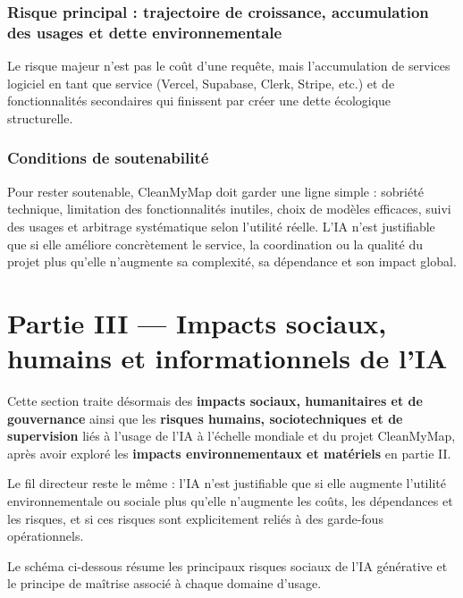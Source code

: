 \documentclass[
  10pt,
  a4paper,
  DIV=11,
  numbers=noendperiod,
  oneside]{scrreprt}
\let\oldtextbf\textbf
\renewcommand{\textbf}[1]{\oldtextbf{\textcolor{cmmnavy}{#1}}}
\begin{document}
\subsection{Risque principal : trajectoire de croissance, accumulation
des usages et dette
environnementale}\label{risque-principal-trajectoire-de-croissance-accumulation-des-usages-et-dette-environnementale}

Le risque majeur n'est pas le coût d'une requête, mais l'accumulation de
services logiciel en tant que service (Vercel, Supabase, Clerk, Stripe,
etc.) et de fonctionnalités secondaires qui finissent par créer une
dette écologique structurelle.

\subsection{Conditions de
soutenabilité}\label{conditions-de-soutenabilituxe9}

Pour rester soutenable, CleanMyMap doit garder une ligne simple :
sobriété technique, limitation des fonctionnalités inutiles, choix de
modèles efficaces, suivi des usages et arbitrage systématique selon
l'utilité réelle. L'IA n'est justifiable que si elle améliore
concrètement le service, la coordination ou la qualité du projet plus
qu'elle n'augmente sa complexité, sa dépendance et son impact global.

\newpage{}

\chapter{Partie III --- Impacts sociaux, humains et informationnels de
l'IA}\label{partie-iii-impacts-sociaux-humains-et-informationnels-de-lia}

Cette section traite désormais des \textbf{impacts sociaux, humanitaires
et de gouvernance} ainsi que les \textbf{risques humains,
sociotechniques et de supervision} liés à l'usage de l'IA à l'échelle
mondiale et du projet CleanMyMap, après avoir exploré les
\textbf{impacts environnementaux et matériels} en partie II.

Le fil directeur reste le même : l'IA n'est justifiable que si elle
augmente l'utilité environnementale ou sociale plus qu'elle n'augmente
les coûts, les dépendances et les risques, et si ces risques sont
explicitement reliés à des garde-fous opérationnels.

Le schéma ci-dessous résume les principaux risques sociaux de l'IA
générative et le principe de maîtrise associé à chaque domaine d'usage.
\end{document}

